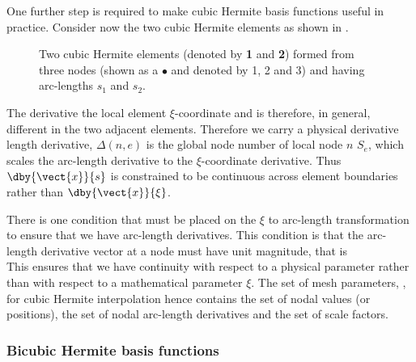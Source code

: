 One further step is required to make cubic Hermite basis functions useful in
practice.  Consider now the two cubic Hermite elements as shown in 
.

\begin{figure}[htbp] \centering
  
  \caption{Two cubic Hermite elements (denoted by {\bf 1} and {\bf 2}) formed
    from three nodes (shown as a $\bullet$ and denoted by 1, 2 and 3) and 
    having arc-lengths $s_{1}$ and $s_{2}$.}
  \label{fig:cubHermelem}
\end{figure}

The derivative 
the local element $\xi$-coordinate and is therefore, in general, different in
the two adjacent elements. Therefore we carry a physical derivative
\begin{equation}
  \label{eqn:xitoarclength}
\end{equation}
length derivative, $\Delta(n,e)$ is the global node number of local node $n$
$S_{e}$, which scales the arc-length derivative to the $\xi$-coordinate
derivative.  Thus $\dby{\vect{x}}{s}$ is constrained to be continuous across
element boundaries rather than $\dby{\vect{x}}{\xi}$.

There is one condition that must be placed on the $\xi$ to arc-length
transformation to ensure that we have arc-length derivatives. This condition
is that the arc-length derivative vector at a node must have unit magnitude,
that is
\begin{equation}
  \label{eqn:cubHermnormconst}
\end{equation}
This ensures that we have continuity with respect to a physical parameter
rather than with respect to a mathematical parameter $\xi$. The set of mesh
parameters, , for cubic Hermite interpolation hence contains the set
of nodal values (or positions), the set of nodal arc-length derivatives and
the set of scale factors.

\subsubsection{Bicubic Hermite basis functions}

